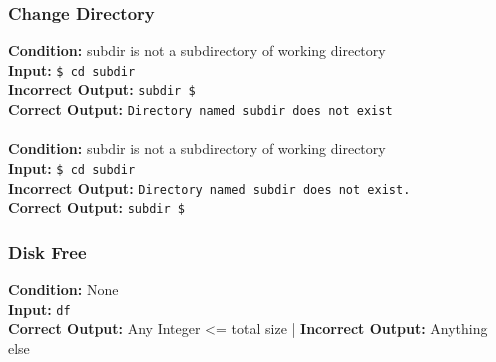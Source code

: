 \documentclass[12pt, letterpaper]{article}
\begin{document}
\subsubsection{Change Directory}
\textbf{Condition:} subdir is not a subdirectory of working directory \\
\textbf{Input:} \texttt{\$ cd subdir}\\
\textbf{Incorrect Output:} \texttt{subdir \$ }\\
\textbf{Correct Output:} \texttt{Directory named subdir does not exist}\\
\\
\textbf{Condition:} subdir is not a subdirectory of working directory \\
\textbf{Input:} \texttt{\$ cd subdir}\\
\textbf{Incorrect Output:} \texttt{Directory named subdir does not exist.}\\ 
\textbf{Correct Output:} \texttt{subdir \$ }\\

\subsubsection{Disk Free}
\textbf{Condition: } None \\
\textbf{Input:}  \texttt{df} \\
\textbf{Correct Output:} Any Integer \textless= total size | \textbf{Incorrect Output:} Anything else\\
\end{document}
